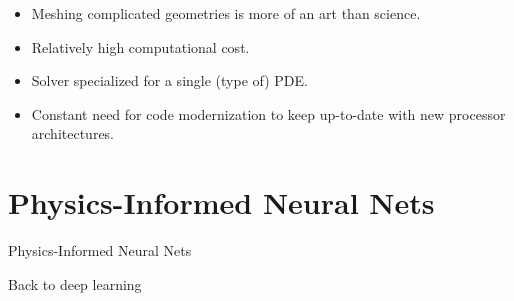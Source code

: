 \documentclass[aspectratio=169,compress,12pt,dvipsnames]{beamer}
\begin{document}
\begin{frame}
\begin{minipage}{.68\textwidth}
    \begin{itemize}
      \item Meshing complicated geometries is more of an art than science.
        \par
      \item Relatively high computational cost.
        \par
      \item Solver specialized for a single (type of) PDE.
        \par
      \item Constant need for code modernization to keep up-to-date with new processor architectures.
    \end{itemize}
  \end{minipage}
\end{frame}

\section{Physics-Informed Neural Nets}

\begin{frame}
  \vfill
  { Physics-Informed Neural Nets}

  { Back to deep learning}
  \vfill
\end{frame}
\end{document}
